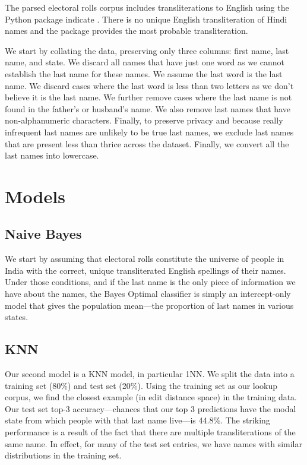 \documentclass[11pt,  letterpaper]{article}
\begin{document}
The parsed electoral rolls corpus \citep{DVN/MUEGDT_2018} includes transliterations to English using the Python package indicate \citep{Chintalapati_Indicate_Transliterate_Indic_2022}. There is no unique English transliteration of Hindi names and the package provides the most probable transliteration. 

We start by collating the data, preserving only three columns: first name, last name, and state. We discard all names that have just one word as we cannot establish the last name for these names. We assume the last word is the last name. We discard cases where the last word is less than two letters as we don't believe it is the last name. We further remove cases where the last name is not found in the father's or husband's name. We also remove last names that have non-alphanumeric characters. Finally, to preserve privacy and because really infrequent last names are unlikely to be true last names, we exclude last names that are present less than thrice across the dataset. Finally, we convert all the last names into lowercase. 

\section{Models}

\subsection{Naive Bayes}

We start by assuming that electoral rolls constitute the universe of people in India with the correct, unique transliterated English spellings of their names. Under those conditions, and if the last name is the only piece of information we have about the names, the Bayes Optimal classifier is simply an intercept-only model that gives the population mean---the proportion of last names in various states. 

\subsection{KNN}

Our second model is a KNN model, in particular 1NN. We split the data into a training set (80\%) and test set (20\%). Using the training set as our lookup corpus, we find the closest example (in edit distance space) in the training data. Our test set top-3 accuracy---chances that our top 3 predictions have the modal state from which people with that last name live---is 44.8\%. The striking performance is a result of the fact that there are multiple transliterations of the same name. In effect, for many of the test set entries, we have names with similar distributions in the training set. 
\end{document}
